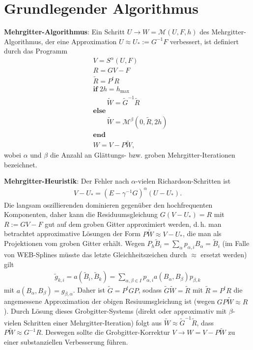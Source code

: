 \section{%
    Grundlegender Algorithmus%
}

\textbf{Mehrgitter-Algorithmus}:
Ein Schritt
$U \rightarrow W = \mathcal{M}(U, F, h)$
des Mehrgitter-Algorithmus, der eine Approximation $U \approx U_\ast := G^{-1} F$ verbessert,
ist definiert durch das Programm
\begin{align*}
    &V = S^\alpha(U, F)\\
    &R = GV - F\\
    &\widetilde{R} = P^t R\\
    &\mathbf{if}\; 2h = h_{\text{max}}\\
    &\qquad\widetilde{W} = \widetilde{G}^{-1} \widetilde{R}\\
    &\mathbf{else}\\
    &\qquad\widetilde{W} = \mathcal{M}^\beta(0, \widetilde{R}, 2h)\\
    &\mathbf{end}\\
    &W = V - P\widetilde{W},
\end{align*}
wobei $\alpha$ und $\beta$ die Anzahl an Glättungs- bzw. groben Mehrgitter-Iterationen bezeichnet.

\linie
\pagebreak

\textbf{Mehrgitter-Heuristik}:
Der Fehler nach $\alpha$-vielen Richardson-Schritten ist
\begin{align*}
    V - U_\ast = (E - \gamma^{-1} G)^\alpha (U - U_\ast).
\end{align*}
Die langsam oszillierenden dominieren
gegenüber den hochfrequenten Komponenten, daher kann die
Residuumsgleichung $G(V - U_\ast) = R$ mit $R := GV - F$
gut auf dem groben Gitter approximiert werden, d.\,h. man betrachtet approximative Lösungen
der Form $P\widetilde{W} \approx V - U_\ast$, die man als Projektionen vom groben Gitter erhält.
Wegen $P_h \widetilde{B}_i = \sum_\alpha p_{\alpha,i} B_\alpha = \widetilde{B}_i$
(im Falle von WEB-Splines müsste das letzte Gleichheitszeichen durch $\approx$ ersetzt werden)
gilt
\begin{align*}
    \widetilde{g}_{k,i}
    = a(\widetilde{B}_i, \widetilde{B}_k)
    = \sum_{\alpha,\beta \in I} p_{\alpha,i} a(B_\alpha, B_\beta) p_{\beta,k}
\end{align*}
mit $a(B_\alpha, B_\beta) = g_{\beta,\alpha}$.
Daher ist $\widetilde{G} = P^t G P$, sodass
$\widetilde{G} \widetilde{W} = \widetilde{R}$ mit $\widetilde{R} = P^t R$
die angemessene Approximation der obigen Resiuumsgleichung ist
(wegen $GP\widetilde{W} \approx R$).
Durch Lösung dieses Grobgitter-Systems
(direkt oder approximativ mit $\beta$-vielen Schritten einer Mehrgitter-Iteration)
folgt aus $\widetilde{W} \approx \widetilde{G}^{-1} \widetilde{R}$,
dass $P\widetilde{W} \approx G^{-1} R$.
Deswegen sollte die Grobgitter-Korrektur $V \rightarrow W = V - P\widetilde{W}$ zu einer
substanziellen Verbesserung führen.

